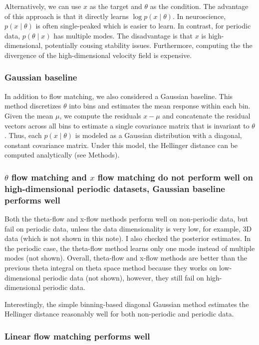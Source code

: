Alternatively, we can use $x$ as the target and $\theta$ as the condition. The advantage of this approach is that it directly learns $\log p(x \mid \theta)$. In neuroscience, $p(x \mid \theta)$ is often single-peaked which is easier to learn. In contrast, for periodic data, $p(\theta \mid x)$ has multiple modes. The disadvantage is that $x$ is high-dimensional, potentially cousing stability issues. Furthermore, computing the the divergence of the high-dimensional velocity field is expensive.

\subsubsection{Gaussian baseline}

In addition to flow matching, we also considered a Gaussian baseline. This method discretizes $\theta$ into bins and estimates the mean response within each bin. Given the mean $\mu$, we compute the residuals $x-\mu$ and concatenate the residual vectors across all bins to estimate a single covariance matrix that is invariant to $\theta$. Thus, each $p(x \mid \theta)$ is modeled as a Gaussian distribution with a diagonal, constant covariance matrix. Under this model, the Hellinger distance can be computed analytically (see Methods).

\subsubsection{$\theta$ flow matching and $x$ flow matching do not perform well on high-dimensional periodic datasets, Gaussian baseline performs well}

Both the theta-flow and x-flow methods perform well on non-periodic data, but fail on periodic data, unless the data dimensionality is very low, for example, 3D data (which is not shown in this note). I also checked the posterior estimates. In the periodic case, the theta-flow method learns only one mode instead of multiple modes (not shown). Overall, theta-flow and x-flow methods are better than the previous theta integral on theta space method because they works on low-dimensional periodic data (not shown), however, they still fail on high-dimensional periodic data.

Interestingly, the simple binning-based diagonal Gaussian method estimates the Hellinger distance reasonably well for both non-periodic and periodic data.

\subsubsection{Linear flow matching performs well}


